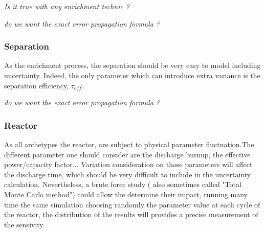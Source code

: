 \documentclass[dvips,12pt]{article}
\begin{document}


\textit{Is it true with any enrichment technic ?}

\textit{do we want the exact error propagation formula ?}

\subsubsection{Separation}
As the enrichment process, the separation should
be very easy to model including
uncertainty. Indeed, the only parameter which can
introduce extra variance is the separation
efficiency, $\tau_{eff}$.



\textit{do we want the exact error propagation formula ?}

\subsubsection{Reactor}
As all archetypes the reactor, are subject to
physical parameter fluctuation.The different
parameter one should consider are the discharge
burnup, the effective power/capacity
factor... Variation consideration on those
parameters will affect the discharge time, which
should be very difficult to include in the
uncertainty calculation. Nevertheless, a brute
force study ( also sometimes called "Total Monte
Carlo method") could allow the determine their
impact, running many time the same simulation
choosing randomly the parameter value at each
cycle of the reactor, the distribution of the
results will provides a precise measurement of the
sensivity.\\
\end{document}
